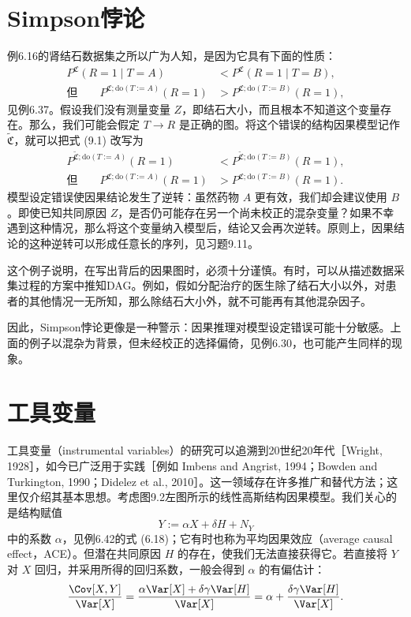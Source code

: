 \section{Simpson悖论}

例6.16的肾结石数据集之所以广为人知，是因为它具有下面的性质：
\begin{equation}
\begin{aligned}
 P^{\mathfrak C}(R=1\mid T=A)&<P^{\mathfrak C}(R=1\mid T=B),\\
 \text{但}\qquad
 P^{\mathfrak C;\mathrm{do}(T:=A)}(R=1)&>P^{\mathfrak C;\mathrm{do}(T:=B)}(R=1),
\end{aligned}\tag{9.1}
\end{equation}
见例6.37。假设我们没有测量变量 $Z$，即结石大小，而且根本不知道这个变量存在。那么，我们可能会假定 $T\to R$ 是正确的图。将这个错误的结构因果模型记作 $\widetilde{\mathfrak C}$，就可以把式 (9.1) 改写为
\begin{equation}
\begin{aligned}
 P^{\widetilde{\mathfrak C};\mathrm{do}(T:=A)}(R=1)
 &<P^{\widetilde{\mathfrak C};\mathrm{do}(T:=B)}(R=1),\\
 \text{但}\qquad P^{\mathfrak C;\mathrm{do}(T:=A)}(R=1)
 &>P^{\mathfrak C;\mathrm{do}(T:=B)}(R=1).
\end{aligned}\tag{9.2}
\end{equation}
模型设定错误使因果结论发生了逆转：虽然药物 $A$ 更有效，我们却会建议使用 $B$。即使已知共同原因 $Z$，是否仍可能存在另一个尚未校正的混杂变量？如果不幸遇到这种情况，那么将这个变量纳入模型后，结论又会再次逆转。原则上，因果结论的这种逆转可以形成任意长的序列，见习题9.11。

这个例子说明，在写出背后的因果图时，必须十分谨慎。有时，可以从描述数据采集过程的方案中推知DAG。例如，假如分配治疗的医生除了结石大小以外，对患者的其他情况一无所知，那么除结石大小外，就不可能再有其他混杂因子。

因此，Simpson悖论更像是一种警示：因果推理对模型设定错误可能十分敏感。上面的例子以混杂为背景，但未经校正的选择偏倚，见例6.30，也可能产生同样的现象。

\section{工具变量}

工具变量（instrumental variables）的研究可以追溯到20世纪20年代［Wright, 1928］，如今已广泛用于实践［例如 Imbens and Angrist, 1994；Bowden and Turkington, 1990；Didelez et al., 2010］。这一领域存在许多推广和替代方法；这里仅介绍其基本思想。考虑图9.2左图所示的线性高斯结构因果模型。我们关心的是结构赋值
\[
 Y:=\alpha X+\delta H+N_Y
\]
中的系数 $\alpha$，见例6.42的式 (6.18)；它有时也称为平均因果效应（average causal effect，ACE）。但潜在共同原因 $H$ 的存在，使我们无法直接获得它。若直接将 $Y$ 对 $X$ 回归，并采用所得的回归系数，一般会得到 $\alpha$ 的有偏估计：
\[
 \frac{\Cov[X,Y]}{\Var[X]}
 =\frac{\alpha\Var[X]+\delta\gamma\Var[H]}{\Var[X]}
 =\alpha+\frac{\delta\gamma\Var[H]}{\Var[X]}.
\]

